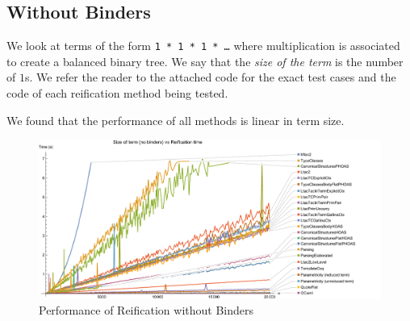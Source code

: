 \subsection{Without Binders} \label{sec:perf:no-binders}
We look at terms of the form \texttt{1 * 1 * 1 * \ldots} where multiplication is associated to create a balanced binary tree.
We say that the \emph{size of the term} is the number of $1$s.
We refer the reader to the attached code for the exact test cases and the code of each reification method being tested.

We found that the performance of all methods is linear in term size.

\begin{figure}
\noindent \includegraphics[width=\textwidth]{reification-by-parametricity/actual-reif-no-binders.pdf}
\caption{Performance of Reification without Binders}\label{fig:graph-reif-no-binders}
\end{figure}

